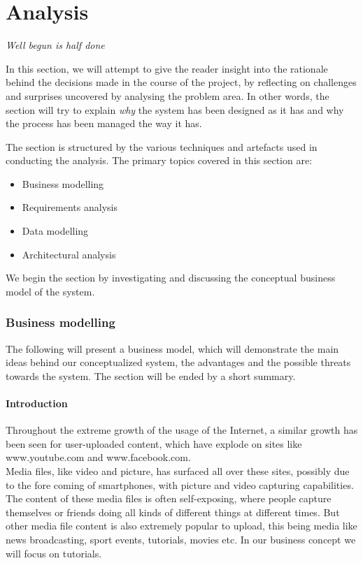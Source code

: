 \part{Analysis}
\vspace{30pt}
\begin{center}
\textit{Well begun is half done}
\end{center}
\vspace{30pt}

In this section, we will attempt to give the reader insight into the rationale behind the decisions made in the course of the project, by reflecting on challenges and surprises uncovered by analysing the problem area. In other words, the section will try to explain \textit{why} the system has been designed as it has and why the process has been managed the way it has.

The section is structured by the various techniques and artefacts used in conducting the analysis. The primary topics covered in this section are:
\begin{itemize}
\item Business modelling
\item Requirements analysis
\item Data modelling
\item Architectural analysis
\end{itemize}
We begin the section by investigating and discussing the conceptual business model of the system.

\section{Business modelling}
The following will present a business model, which will demonstrate the main ideas behind our conceptualized system, the advantages and the possible threats towards the system. The section will be ended by a short summary. 

\subsection{Introduction}
Throughout the extreme growth of the usage of the Internet, a similar growth has been seen for user-uploaded content, which have explode on sites like www.youtube.com and www.facebook.com.\\ 
Media files, like video and picture, has surfaced all over these sites, possibly due to the fore coming of smartphones, with picture and video capturing capabilities. The content of these media files is often self-exposing, where people capture themselves or friends doing all kinds of different things at different times. But other media file content is also extremely popular to upload, this being media like news broadcasting, sport events, tutorials, movies etc. In our business concept we will focus on tutorials.

